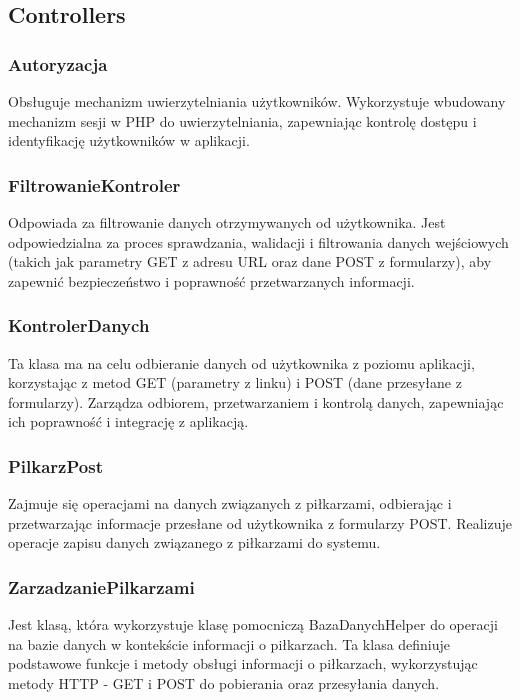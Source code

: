 \subsection{Controllers}
    \subsubsection{Autoryzacja}
    Obsługuje mechanizm uwierzytelniania użytkowników. Wykorzystuje wbudowany mechanizm sesji w PHP do uwierzytelniania, zapewniając kontrolę dostępu i identyfikację użytkowników w aplikacji.
     


    \subsubsection{FiltrowanieKontroler}
    Odpowiada za filtrowanie danych otrzymywanych od użytkownika. Jest odpowiedzialna za proces sprawdzania, walidacji i filtrowania danych wejściowych (takich jak parametry GET z adresu URL oraz dane POST z formularzy), aby zapewnić bezpieczeństwo i poprawność przetwarzanych informacji.
     



    \subsubsection{KontrolerDanych}
    Ta klasa ma na celu odbieranie danych od użytkownika z poziomu aplikacji, korzystając z metod GET (parametry z linku) i POST (dane przesyłane z formularzy). Zarządza odbiorem, przetwarzaniem i kontrolą danych, zapewniając ich poprawność i integrację z aplikacją.
     


    \subsubsection{PilkarzPost}
    Zajmuje się operacjami na danych związanych z piłkarzami, odbierając i przetwarzając informacje przesłane od użytkownika z formularzy POST. Realizuje operacje zapisu danych związanego z piłkarzami do systemu.
     


    \subsubsection{ZarzadzaniePilkarzami}
    Jest klasą, która wykorzystuje klasę pomocniczą BazaDanychHelper do operacji na bazie danych w kontekście informacji o piłkarzach. Ta klasa definiuje podstawowe funkcje i metody obsługi informacji o piłkarzach, wykorzystując metody HTTP - GET i POST do pobierania oraz przesyłania danych.
     


